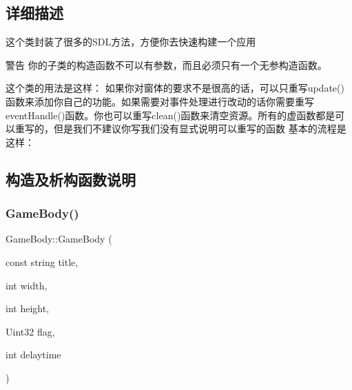 \subsection{详细描述}
这个类封装了很多的\+S\+D\+L方法，方便你去快速构建一个应用 

\begin{DoxyWarning}{警告}
你的子类的构造函数不可以有参数，而且必须只有一个无参构造函数。
\end{DoxyWarning}
这个类的用法是这样： 如果你对窗体的要求不是很高的话，可以只重写update()函数来添加你自己的功能。如果需要对事件处理进行改动的话你需要重写event\+Handle()函数。你也可以重写clean()函数来清空资源。所有的虚函数都是可以重写的，但是我们不建议你写我们没有显式说明可以重写的函数 基本的流程是这样： 
\begin{DoxyCode}{0}
\DoxyCodeLine{        \textcolor{comment}{//TODO Initialize....}}
\DoxyCodeLine{    \}}
\DoxyCodeLine{ \textcolor{comment}{//TODO Other Override....}}
\DoxyCodeLine{\};}
\DoxyCodeLine{ }
\DoxyCodeLine{\}}
\end{DoxyCode}
 

\subsection{构造及析构函数说明}
\mbox{\label{class_game_body_ad93266a1461592dbc9e9f452adff1304}} 
\subsubsection{\texorpdfstring{GameBody()}{GameBody()}}
{\footnotesize\ttfamily Game\+Body\+::\+Game\+Body (\begin{DoxyParamCaption}\item[{const string}]{title,  }\item[{int}]{width,  }\item[{int}]{height,  }\item[{Uint32}]{flag,  }\item[{int}]{delaytime }\end{DoxyParamCaption})}



